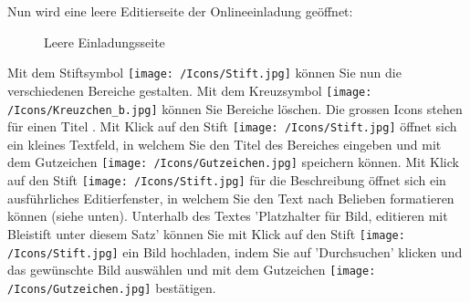 Nun wird eine leere Editierseite der Onlineeinladung geöffnet:

\begin{figure}[H]
\caption{Leere Einladungsseite}
\end{figure}

Mit dem Stiftsymbol \texttt{[image: /Icons/Stift.jpg]} können Sie nun die verschiedenen Bereiche gestalten. Mit dem Kreuzsymbol \texttt{[image: /Icons/Kreuzchen\_b.jpg]} können Sie Bereiche löschen.
Die grossen Icons stehen für einen Titel . Mit Klick auf den Stift \texttt{[image: /Icons/Stift.jpg]} öffnet sich ein kleines Textfeld, in welchem Sie den Titel des Bereiches eingeben und mit dem Gutzeichen \texttt{[image: /Icons/Gutzeichen.jpg]} speichern können.
Mit Klick auf den Stift \texttt{[image: /Icons/Stift.jpg]} für die Beschreibung  öffnet sich ein ausführliches Editierfenster, in welchem Sie den Text nach Belieben formatieren können (siehe unten). Unterhalb des Textes 'Platzhalter für Bild, editieren mit Bleistift unter diesem Satz' können Sie mit Klick auf den Stift \texttt{[image: /Icons/Stift.jpg]} ein Bild hochladen, indem Sie auf 'Durchsuchen' klicken und das gewünschte Bild auswählen und mit dem Gutzeichen \texttt{[image: /Icons/Gutzeichen.jpg]} bestätigen. 

